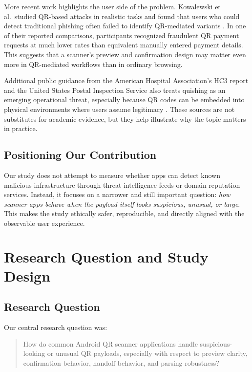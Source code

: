 \documentclass[11pt]{article}
\begin{document}
More recent work highlights the user side of the problem. Kowalewski et al.\ studied QR-based attacks in realistic tasks and found that users who could detect traditional phishing often failed to identify QR-mediated variants \cite{usenix-qr}. In one of their reported comparisons, participants recognized fraudulent QR payment requests at much lower rates than equivalent manually entered payment details. This suggests that a scanner's preview and confirmation design may matter even more in QR-mediated workflows than in ordinary browsing.

Additional public guidance from the American Hospital Association's HC3 report and the United States Postal Inspection Service also treats quishing as an emerging operational threat, especially because QR codes can be embedded into physical environments where users assume legitimacy \cite{aha-quishing,uspis-quishing}. These sources are not substitutes for academic evidence, but they help illustrate why the topic matters in practice.

\subsection{Positioning Our Contribution}

Our study does not attempt to measure whether apps can detect known malicious infrastructure through threat intelligence feeds or domain reputation services. Instead, it focuses on a narrower and still important question: \emph{how scanner apps behave when the payload itself looks suspicious, unusual, or large}. This makes the study ethically safer, reproducible, and directly aligned with the observable user experience.

\section{Research Question and Study Design}

\subsection{Research Question}

Our central research question was:

\begin{quote}
How do common Android QR scanner applications handle suspicious-looking or unusual QR payloads, especially with respect to preview clarity, confirmation behavior, handoff behavior, and parsing robustness?
\end{quote}
\end{document}

